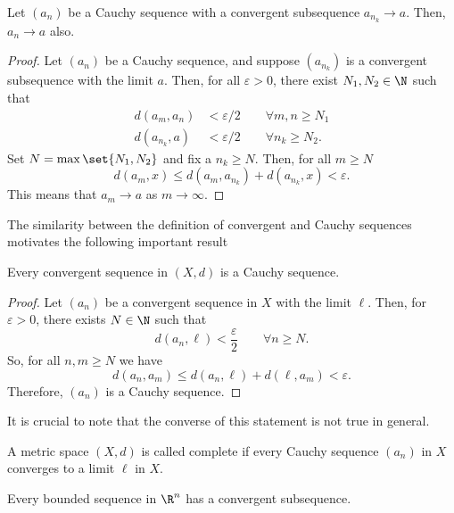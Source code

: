 \begin{nthm}
  Let $(a_n)$ be a Cauchy sequence with a convergent subsequence $a_{n_{k}} \to a$. Then, $a_n \to a$ also.
\end{nthm}
\begin{proof}
  Let $(a_n)$ be a Cauchy sequence, and suppose $(a_{n_{k}})$ is a convergent subsequence with the limit $a$. Then, for all $\varepsilon>0$, there exist $N_1, N_2 \in \N$ such that
  \begin{align*}
    d(a_m, a_n) &<\varepsilon/2 \qquad\forall m,n\geq N_1\\
    d(a_{n_{k}}, a) &<\varepsilon/2 \qquad\forall n_{k}\geq N_2.
  \end{align*}
  Set $N = \max\set{N_1, N_2}$ and fix a $n_k \geq N$. Then, for all $m \geq N$
  \begin{equation*}
    d(a_m, x) \leq d(a_m, a_{n_{k}}) + d(a_{n_{k}}, x)
    < \varepsilon.
  \end{equation*}
  This means that $a_m \to a$ as $m \to \infty$.
\end{proof}

The similarity between the definition of convergent and Cauchy sequences motivates the following important result
\begin{nthm}
  Every convergent sequence in $(X,d)$ is a Cauchy sequence.
\end{nthm}
\begin{proof}
  Let $(a_n)$ be a convergent sequence in $X$ with the limit $\ell$. Then, for $\varepsilon > 0$, there exists $N \in \N$ such that
  \begin{equation*}
    d(a_n, \ell) < \frac{\varepsilon}{2}
    \qquad\forall n \geq N.
  \end{equation*}
  So, for all $n,m \geq N$ we have
  \begin{equation*}
    d(a_n, a_m) \leq d(a_n, \ell) + d(\ell, a_m) < \varepsilon.
  \end{equation*}
  Therefore, $(a_n)$ is a Cauchy sequence.
\end{proof}
It is crucial to note that the converse of this statement is not true in general.

\begin{ndfn}
  A metric space $(X,d)$ is called complete if every Cauchy sequence $(a_n)$ in $X$ converges to a limit $\ell$ in $X$.
\end{ndfn}

\begin{nthm}
  Every bounded sequence in $\R^n$ has a convergent subsequence.
\end{nthm}

